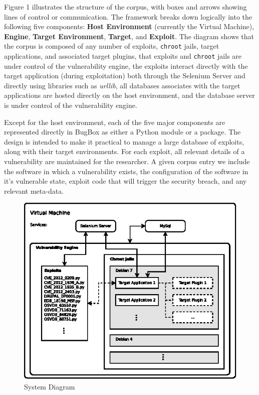 \documentclass[letterpaper,twocolumn,10pt]{article}
\begin{document}
Figure 1 illustrates the structure of the corpus, with boxes and arrows showing lines of control or communication. The framework breaks down logically into the following five components: {\bf Host Environment} (currently the Virtual Machine), {\bf Engine}, {\bf Target Environment}, {\bf Target}, and {\bf Exploit}. The diagram shows that the corpus is composed of any number of exploits, {\tt chroot} jails, target applications, and associated target plugins, that exploits and {\tt chroot} jails are under control of the vulnerability engine, the exploits interact directly with the target application (during exploitation) both through the Selenium Server and directly using libraries such as \emph{urllib}, all databases associates with the target applications are hosted directly on the host environment, and the database server is under control of the vulnerability engine.\par
Except for the host environment, each of the five major components are represented directly in BugBox as either a Python module or a package. The design is intended to make it practical to manage a large database of exploits, along with their target environments. For each exploit, all relevant details of a vulnerability are maintained for the researcher. A given corpus entry we include the software in which a vulnerability exists, the configuration of the software in it's vulnerable state, exploit code that will trigger the security breach, and any relevant meta-data.\par

\begin{figure}[!tp]
\begin{center}
\includegraphics[scale=1.17]{system_diagram.eps}
\end{center}
\caption{System Diagram}
\end{figure}
\end{document}
